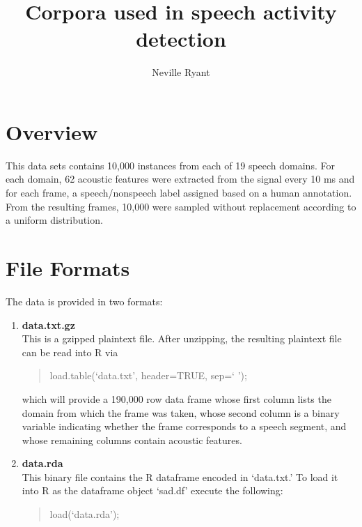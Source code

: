 \documentclass[12pt]{article}
\title{Corpora used in speech activity detection}
\author{Neville Ryant}
\date{}
\begin{document}
\maketitle

\section{Overview}
This data sets contains 10,000 instances from each of 19 speech domains. For each domain, 62 acoustic features were extracted from the signal every 10 ms and for each frame, a speech/nonspeech label assigned based on a human annotation. From the resulting frames, 10,000 were sampled without replacement according to a uniform distribution. 

\section{File Formats}
The data is provided in two formats:
    \begin{enumerate}
        \item {\bf data.txt.gz} \\
              This is a gzipped plaintext file. After unzipping, the resulting plaintext file can be read into R via
              \begin{quotation}
                load.table(`data.txt', header=TRUE, sep=` ');
              \end{quotation}
              which will provide a 190,000 row data frame whose first column lists the domain from which the frame was taken, whose second column is a binary variable indicating whether the frame corresponds to a speech segment, and whose remaining columns contain acoustic features.

         \item {\bf data.rda} \\
               This binary file contains the R dataframe encoded in `data.txt.' To load it into R as the dataframe object `sad.df' execute the following:
               \begin{quotation}
                   load(`data.rda');
               \end{quotation}
    \end{enumerate}
\end{document}
